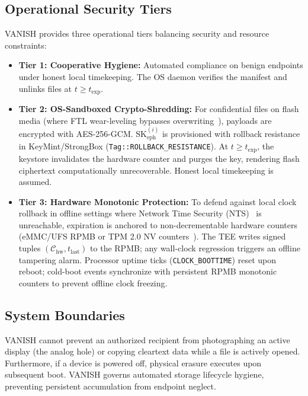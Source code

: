 \subsection{Operational Security Tiers}
VANISH provides three operational tiers balancing security and resource constraints:
\begin{itemize}
    \item \textbf{Tier 1: Cooperative Hygiene:} Automated compliance on benign endpoints under honest local timekeeping. The OS daemon verifies the manifest and unlinks files at $t \ge t_{\text{exp}}$.
    \item \textbf{Tier 2: OS-Sandboxed Crypto-Shredding:} For confidential files on flash media (where FTL wear-leveling bypasses overwriting~\cite{wei2011reliably}), payloads are encrypted with AES-256-GCM. $\text{SK}_{\text{eph}}^{(i)}$ is provisioned with rollback resistance in KeyMint/StrongBox (\texttt{Tag::ROLLBACK\_RESISTANCE}). At $t \ge t_{\text{exp}}$, the keystore invalidates the hardware counter and purges the key, rendering flash ciphertext computationally unrecoverable. Honest local timekeeping is assumed.
    \item \textbf{Tier 3: Hardware Monotonic Protection:} To defend against local clock rollback in offline settings where Network Time Security (NTS)~\cite{rfc8915nts} is unreachable, expiration is anchored to non-decrementable hardware counters (eMMC/UFS RPMB or TPM 2.0 NV counters~\cite{tpm20specification}). The TEE writes signed tuples $(\mathcal{C}_{\text{hw}}, t_{\text{last}})$ to the RPMB; any wall-clock regression triggers an offline tampering alarm. Processor uptime ticks (\texttt{CLOCK\_BOOTTIME}) reset upon reboot; cold-boot events synchronize with persistent RPMB monotonic counters to prevent offline clock freezing.
\end{itemize}

\subsection{System Boundaries}
VANISH cannot prevent an authorized recipient from photographing an active display (the analog hole) or copying cleartext data while a file is actively opened. Furthermore, if a device is powered off, physical erasure executes upon subsequent boot. VANISH governs automated storage lifecycle hygiene, preventing persistent accumulation from endpoint neglect.
